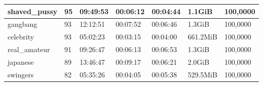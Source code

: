 \begin{table}[]
\begin{tabular}{l|l|l|l|l|l|l}
shaved\_pussy                                      & 95                                                  & 09:49:53                                                 & 00:06:12                                                & 00:04:44                                               & 1.1GiB                                               & 100,0000                                                      \\ \hline
gangbang                                           & 93                                                  & 12:12:51                                                 & 00:07:52                                                & 00:06:46                                               & 1.3GiB                                               & 100,0000                                                      \\ \hline
celebrity                                          & 93                                                  & 05:02:23                                                 & 00:03:15                                                & 00:04:00                                               & 661.2MiB                                             & 100,0000                                                      \\ \hline
real\_amateur                                      & 91                                                  & 09:26:47                                                 & 00:06:13                                                & 00:06:53                                               & 1.3GiB                                               & 100,0000                                                      \\ \hline
japanese                                           & 89                                                  & 13:46:47                                                 & 00:09:17                                                & 00:06:21                                               & 2.0GiB                                               & 100,0000                                                      \\ \hline
swingers                                           & 82                                                  & 05:35:26                                                 & 00:04:05                                                & 00:05:38                                               & 529.5MiB                                             & 100,0000                                                      \\ \hline

\end{tabular}
\end{table}
